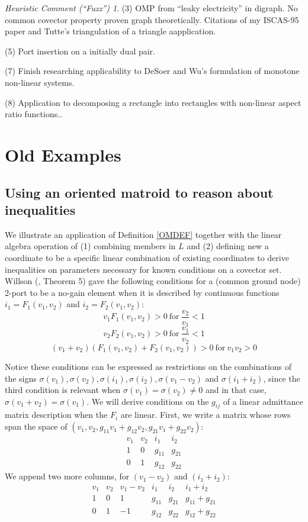 \documentclass{amsproc-sunycstr}
\theoremstyle{plain}
\theoremstyle{definition}
\theoremstyle{remark}
\newtheorem{fuzz}{Heuristic Comment (``Fuzz'')}
\newcommand{\extra}[1]{{{#1}}}
\begin{document}
\begin{fuzz}
(3) OMP from ``leaky electricity'' in digraph.  No common covector property
proven graph theoretically.  Citations of my ISCAS-95 paper and Tutte's
triangulation of a triangle aapplication.

(5) Port insertion on a initially dual pair.

(7) Finish researching applicability to DeSoer and Wu's formulation
of monotone non-linear systems.

(8) Application to decomposing a rectangle into rectangles with
non-linear aspect ratio functions..




\extra{
\section{Old Examples}
\subsection{Using an oriented matroid to reason about inequalities}

We illustrate an application 
of Definition \ref{OMDEF} together with the linear algebra
operation of (1) combining members in $L$ and (2) defining new a coordinate
to be a specific linear combination of existing coordinates to derive
inequalities on parameters necessary for known conditions on a
covector set.  Willson (\cite{WillsonNoGain}, Theorem 5)
gave the following conditions
for a (common ground node) 2-port
to be a no-gain element when it is described by continuous functions 
$i_1=F_1(v_1,v_2)$ and $i_2=F_2(v_1,v_2)$:
\[
v_1F_1(v_1,v_2) > 0 \mathrm{\ for\ } \frac{v_2}{v_1} < 1 
\]
\[
v_2F_2(v_1,v_2) > 0 \mathrm{\ for\ } \frac{v_1}{v_2} < 1 
\]
\[
(v_1+v_2)(F_1(v_1,v_2)+F_2(v_1,v_2)) > 0 \mathrm{\ for\ } v_1 v_2 > 0
\]

Notice these conditions can be expressed as restrictions on the 
combinations of the signs 
$\sigma(v_1),\sigma(v_2),\sigma(i_1),\sigma(i_2),\sigma(v_1-v_2)$
and $\sigma(i_1+i_2)$, since the third condition is relevant when
$\sigma(v_1)=\sigma(v_2)\neq 0$ and in that case, 
$\sigma(v_1+v_2)=\sigma(v_1)$.  We will derive conditions on the $g_{ij}$
of a linear admittance matrix description when the $F_i$ are linear.  First,
we write a matrix whose rows span the space of 
$(v_1,v_2,g_{11}v_1+g_{12}v_2,g_{21}v_1+g_{22}v_2)$:
\[
\begin{array}{cccc} 
v_1 & v_2 & i_1 & i_2 \\ \hline
1   &  0  &  g_{11} & g_{21} \\
0   &  1  &  g_{12} & g_{22} 
\end{array}
\]
We append two more columns, for 
$(v_1-v_2)$ and $(i_1+i_2)$:
\[
\begin{array}{cccccc} 
v_1 & v_2 & v_1-v_2 & i_1 & i_2 & i_1+i_2\\ \hline
1   &  0  & 1  & g_{11} & g_{21} &g_{11} + g_{21} \\
0   &  1  & -1 & g_{12} & g_{22} &  g_{12} + g_{22} 
\end{array}
\]

}
\end{fuzz}
\end{document}
